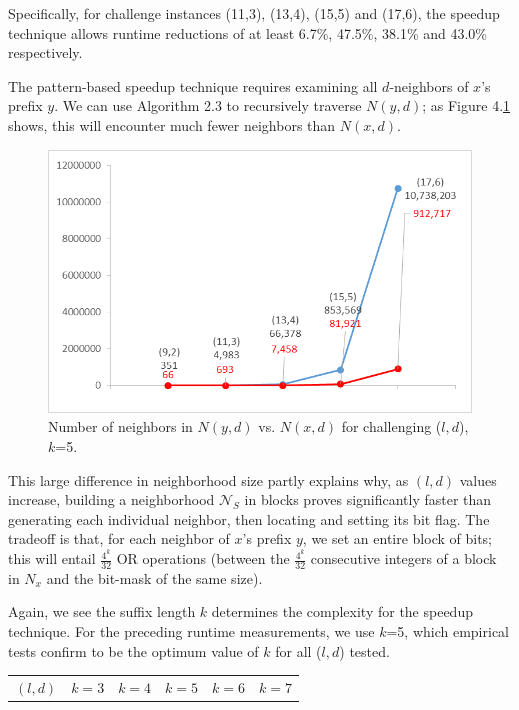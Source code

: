\documentclass[oneside,12pt]{DISCSthesis}
\begin{document}
{		\noindent Specifically, for challenge instances (11,3), (13,4), (15,5) and (17,6), the speedup technique allows runtime reductions of at least 6.7\%, 47.5\%, 38.1\% and 43.0\% respectively.

		\newpage The pattern-based speedup technique requires examining all $d$-neighbors of $x$'s prefix $y$. We can use Algorithm 2.3 to recursively traverse $N(y,d)$; as Figure 4.\ref{fig:nxd_vs_nyd} shows, this will encounter much fewer neighbors than $N(x,d)$.

		\begin{figure}[h]\label{fig:nxd_vs_nyd}
			\centering
			\includegraphics{img/nbrhd_growth_compare.png}
			\caption{Number of neighbors in $N(y,d)$ vs. $N(x,d)$ for challenging ($l,d$), $k$=5.}
			\end{figure}

		This large difference in neighborhood size partly explains why, as $(l,d)$ values increase, building a neighborhood $\mathcal{N}_S$ in blocks proves significantly faster than generating each individual neighbor, then locating and setting its bit flag. 	The tradeoff is that, for each neighbor of $x$'s prefix $y$, we set an entire block of bits; this will entail $\frac{4^k}{32}$ OR operations (between the $\frac{4^k}{32}$ consecutive integers of a block in $N_x$ and the bit-mask of the same size).

		Again, we see the suffix length $k$ determines the complexity for the speedup technique. For the preceding runtime measurements, we use $k$=5, which empirical tests confirm to be the optimum value of $k$ for all ($l,d$) tested.
		\vspace*{5mm}

		\begin{table}[h] \label{tbl:k_values}
			\small
			\renewcommand{\arraystretch}{1.3}
			\centering
			\begin{tabular}{|c|c|c|c|c|c|}
			\hline
			\bfseries\boldmath $(l,d)$ &
			\bfseries\boldmath $k=3$ &
			\bfseries\boldmath $k=4$ &
			\bfseries\boldmath $k=5$ &
			\bfseries\boldmath $k=6$ &
			\bfseries\boldmath $k=7$ \\


\end{tabular}
\end{table}}
\end{document}
